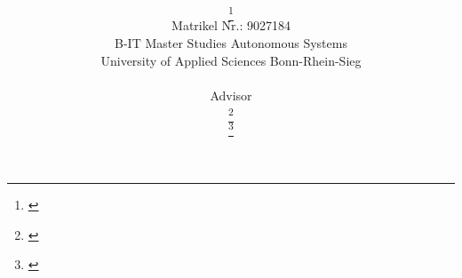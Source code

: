 \title{\PaperTitle\\\PaperSubject}
\author{\href{\PaperMainWriterEMail}{\PaperMainWriter \footnote{\href{mailto:\PaperMainWriterEMail} {\PaperMainWriterEMail}} 
}\\%
Matrikel Nr.: 9027184 \vspace{0.5cm} \\ 
B-IT Master Studies Autonomous Systems \vspace{0.5cm} \\
University of Applied Sciences Bonn-Rhein-Sieg\\ %
\vspace{0.7cm} \\ \setcounter{footnote}{6}
Advisor \\
\href{\PaperLecturerEMail}{\PaperLecturer \footnote{\href{mailto:\PaperLecturerEMail} {\PaperLecturerEMail}}} \\
\href{\PaperLecturerEMailSecond}{\PaperLecturerSecond \footnote{\href{mailto:\PaperLecturerEMailSecond} {\PaperLecturerEMailSecond}}} \\
}%
\date{\PaperDate}
\maketitle
